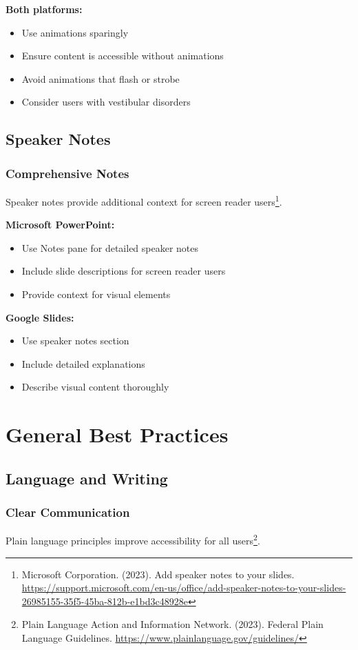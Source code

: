 \textbf{Both platforms:}
\begin{itemize}
\item Use animations sparingly
\item Ensure content is accessible without animations
\item Avoid animations that flash or strobe
\item Consider users with vestibular disorders
\end{itemize}

\subsection{Speaker Notes}

\subsubsection{Comprehensive Notes}
Speaker notes provide additional context for screen reader users\footnote{Microsoft Corporation. (2023). Add speaker notes to your slides. \url{https://support.microsoft.com/en-us/office/add-speaker-notes-to-your-slides-26985155-35f5-45ba-812b-e1bd3c48928e}}.

\textbf{Microsoft PowerPoint:}
\begin{itemize}
\item Use Notes pane for detailed speaker notes
\item Include slide descriptions for screen reader users
\item Provide context for visual elements
\end{itemize}

\textbf{Google Slides:}
\begin{itemize}
\item Use speaker notes section
\item Include detailed explanations
\item Describe visual content thoroughly
\end{itemize}

\section{General Best Practices}

\subsection{Language and Writing}

\subsubsection{Clear Communication}
Plain language principles improve accessibility for all users\footnote{Plain Language Action and Information Network. (2023). Federal Plain Language Guidelines. \url{https://www.plainlanguage.gov/guidelines/}}.

